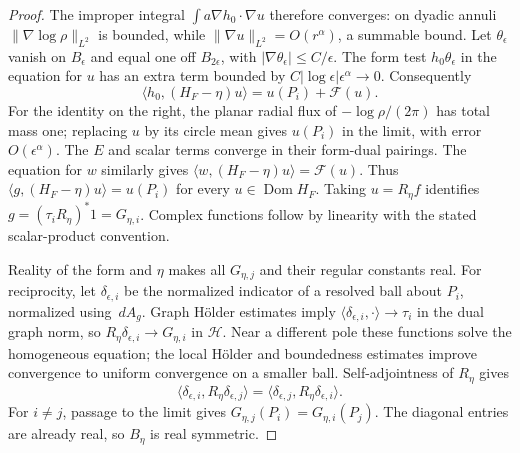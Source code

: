 \documentclass[11pt]{article}
\theoremstyle{remark}\newtheorem{remark}[theorem]{Remark}
\newcommand{\Dom}{\operatorname{Dom}}\newcommand{\dd}{\,d}
\newcommand{\norm}[1]{\lVert#1\rVert}
\begin{document}
\begin{proof}
The improper integral $\int a\nabla h_0\cdot\nabla u$ therefore
converges: on dyadic annuli $\norm{\nabla\log\rho}_{L^2}$ is bounded,
while $\norm{\nabla u}_{L^2}=O(r^\alpha)$, a summable bound. Let
$\theta_\epsilon$ vanish on $B_\epsilon$ and equal one off $B_{2\epsilon}$,
with $|\nabla\theta_\epsilon|\leq C/\epsilon$.
The form test $h_0\theta_\epsilon$ in the equation for $u$ has an extra
term bounded by $C|\log\epsilon|\epsilon^\alpha\to0$.
Consequently
\[
 \langle h_0,(H_F-\eta)u\rangle
       =u(P_i)+\mathcal F(u).
\]
For the identity on the right, the planar radial flux of
$-\log\rho/(2\pi)$ has total mass one; replacing $u$ by its circle mean
gives $u(P_i)$ in the limit, with error $O(\epsilon^\alpha)$.
The $E$ and scalar terms converge in their form-dual pairings. The equation
for $w$ similarly gives
$\langle w,(H_F-\eta)u\rangle=\mathcal F(u)$.
Thus $\langle g,(H_F-\eta)u\rangle=u(P_i)$ for every $u\in\Dom H_F$.
Taking $u=R_\eta f$ identifies $g=(\tau_iR_\eta)^*1=G_{\eta,i}$.
Complex functions follow by linearity with the stated scalar-product convention.

Reality of the form and $\eta$ makes all $G_{\eta,j}$ and their regular
constants real. For reciprocity, let $\delta_{\epsilon,i}$ be the normalized
indicator of a resolved ball about $P_i$, normalized using $\dd A_g$.
Graph H\"older estimates imply
$\langle\delta_{\epsilon,i},\cdot\rangle\to\tau_i$ in the dual graph norm,
so $R_\eta\delta_{\epsilon,i}\to G_{\eta,i}$ in $\mathcal H$.
Near a different pole these functions solve the homogeneous equation;
the local H\"older and boundedness estimates improve convergence to uniform
convergence on a smaller ball. Self-adjointness of $R_\eta$ gives
\[
 \langle\delta_{\epsilon,i},R_\eta\delta_{\epsilon,j}\rangle
 =\langle\delta_{\epsilon,j},R_\eta\delta_{\epsilon,i}\rangle.
\]
For $i\ne j$, passage to the limit gives
$G_{\eta,j}(P_i)=G_{\eta,i}(P_j)$. The diagonal entries are already real,
so $B_\eta$ is real symmetric.
\end{proof}
\end{document}
